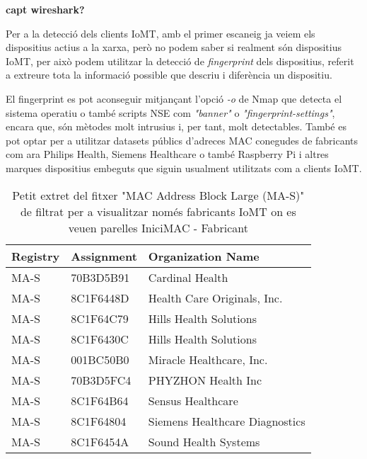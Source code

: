 \textbf{capt wireshark?}

Per a la detecció dels clients IoMT, amb el primer escaneig ja veiem els dispositius actius a la xarxa, però no podem saber si realment són dispositius IoMT, per això podem utilitzar la detecció de \textit{fingerprint} dels dispositius, referit a extreure tota la informació possible que descriu i diferència un dispositiu. 

El fingerprint es pot aconseguir mitjançant l'opció \textit{-o} de Nmap que detecta el sistema operatiu o també scripts NSE com \textit{"banner"} o \textit{"fingerprint-settings"}, encara que, són mètodes molt intrusius i, per tant, molt detectables. També es pot optar per a utilitzar datasets públics d'adreces MAC conegudes de fabricants com ara Philips Health, Siemens Healthcare o també Raspberry Pi i altres marques dispositius embeguts que siguin usualment utilitzats com a clients IoMT.

\begin{table}[H]
\centering
\begin{tabular}{@{}lll@{}}
\toprule
\textbf{Registry} & \textbf{Assignment} & \textbf{Organization Name} \\
\midrule
MA-S & 70B3D5B91 & Cardinal Health \\
MA-S & 8C1F6448D & Health Care Originals, Inc. \\
MA-S & 8C1F64C79 & Hills Health Solutions \\
MA-S & 8C1F6430C & Hills Health Solutions \\
MA-S & 001BC50B0 & Miracle Healthcare, Inc. \\
MA-S & 70B3D5FC4 & PHYZHON Health Inc \\
MA-S & 8C1F64B64 & Sensus Healthcare \\
MA-S & 8C1F64804 & Siemens Healthcare Diagnostics \\
MA-S & 8C1F6454A & Sound Health Systems \\
\bottomrule
\end{tabular}
\caption{Petit extret del fitxer "MAC Address Block Large (MA-S)" de \cite{iotmaclist} filtrat per a visualitzar només fabricants IoMT on es veuen parelles IniciMAC - Fabricant}  %
\label{fig:iot_manufacturers}
\end{table}
